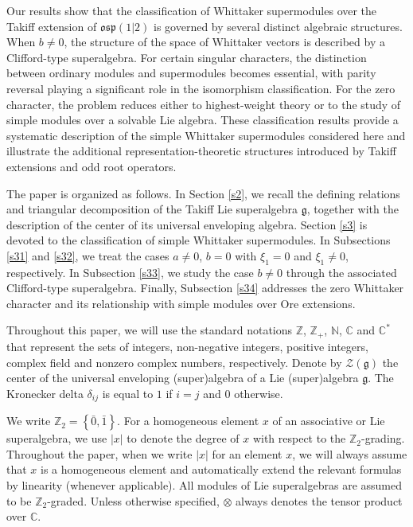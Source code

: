 \documentclass[a4paper,10pt]{article}
\theoremstyle{definition}
\theoremstyle{plain}
\theoremstyle{remark}
\theoremstyle{mystyle}
\numberwithin{equation}{section}
\begin{document}
Our results show that the classification of Whittaker supermodules over the Takiff extension of $\mathfrak{osp}(1|2)$ is governed by several distinct algebraic structures. When $b\neq 0$, the structure of the space of Whittaker vectors is described by a Clifford-type superalgebra. For certain singular characters, the distinction between ordinary modules and supermodules becomes essential, with parity reversal playing a significant role in the isomorphism classification. For the zero character, the problem reduces either to highest-weight theory or to the study of simple modules over a solvable Lie algebra. These classification results provide a systematic description of the simple Whittaker supermodules considered here and illustrate the additional representation-theoretic structures introduced by Takiff extensions and odd root operators.

The paper is organized as follows. In Section \ref{s2}, we recall the defining relations and triangular decomposition of the Takiff Lie superalgebra $\mathfrak g$, together with the description of the center of its universal enveloping algebra. Section \ref{s3} is devoted to the classification of simple Whittaker supermodules. In Subsections \ref{s31} and \ref{s32}, we treat the cases $a\ne0$, $b=0$ with $\xi_1=0$ and $\xi_1\ne0$, respectively. In Subsection \ref{s33}, we study the case $b\ne0$ through the associated Clifford-type superalgebra. Finally, Subsection \ref{s34} addresses the zero Whittaker character and its relationship with simple modules over Ore extensions.
\bigskip

Throughout this paper, we will use the standard notations $\mathbb{Z}$, $\mathbb{Z}_+$, $\mathbb{N}$, $\mathbb{C}$ and $\mathbb{C}^*$ that represent the sets of integers, non-negative integers, positive integers, complex field and nonzero complex numbers, respectively. Denote by $\mathcal{Z}(\mathfrak{g})$ the center of the universal enveloping (super)algebra of a Lie (super)algebra $\mathfrak{g}$. The Kronecker delta $\delta_{ij}$ is equal to $1$ if $i=j$ and $0$ otherwise.

We write $\mathbb{Z}_2=\left\{\bar{0},\bar{1}\right\}$. For a homogeneous element $x$ of an associative or Lie superalgebra, we use $|x|$ to denote the degree of $x$ with respect to the $\mathbb{Z}_2$-grading. Throughout the paper, when we write $|x|$ for an element $x$,  we will always assume that $x$ is a homogeneous element and automatically extend the relevant formulas by linearity (whenever applicable). All modules of Lie superalgebras are assumed to be $\mathbb{Z}_2$-graded. Unless otherwise specified, $\otimes$ always denotes the tensor product over $\mathbb{C}$. 
\end{document}
